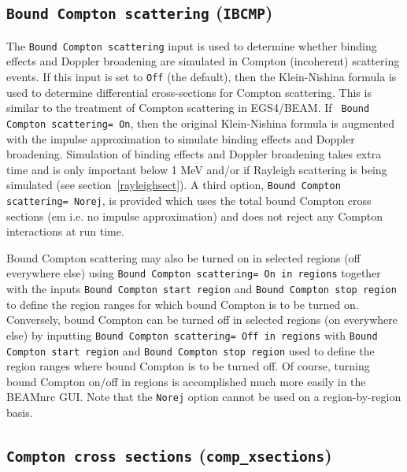 \documentclass[12pt,twoside]{article}
\begin{document}
\subsection{ {\tt Bound Compton scattering} ({\tt IBCMP})}
\label{bcsect}

The {\tt Bound Compton scattering} input is used to determine whether
binding effects and Doppler broadening are simulated in Compton
(incoherent) scattering events.  If this input is set to {\tt Off}
(the default), then the Klein-Nishina formula\cite{KN29} is used to
determine differential cross-sections for Compton scattering.  This is
similar to the treatment of Compton scattering in EGS4/BEAM.  If {\tt
Bound Compton scattering= On}, then the original Klein-Nishina formula is
augmented with the impulse approximation\cite{Ri75} to simulate binding
effects and Doppler broadening.  Simulation of binding effects and Doppler
broadening takes extra time and is only important below 1 MeV and/or if
Rayleigh scattering is being simulated (see section~\ref{rayleighsect}).
A third option, {\tt Bound Compton scattering= Norej}, is provided which
uses the total bound Compton cross sections ({em i.e.} no impulse
approximation) and does not reject any Compton interactions at run
time.

Bound Compton scattering may also be turned on in selected regions
(off everywhere else) using
{\tt  Bound Compton scattering= On in regions} together with
the inputs {\tt Bound Compton start region} and {\tt Bound Compton stop region}
to define the region ranges for which bound Compton is to be turned on.
Conversely, bound Compton can be turned off in selected regions
(on everywhere else) by inputting
{\tt  Bound Compton scattering= Off in regions} with
{\tt Bound Compton start region} and {\tt Bound Compton stop region} used
to define the region ranges where bound Compton is to be turned off.  Of
course, turning bound Compton on/off in regions is accomplished much more
easily in the BEAMnrc GUI.  Note that the {\tt Norej} option cannot be
used on a region-by-region basis.

\subsection{ {\tt Compton cross sections} ({\tt comp\_xsections})}
\end{document}
